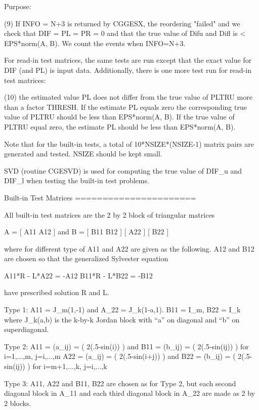 \begin{DoxyParagraph}{Purpose\+: }
\begin{DoxyVerb}
 (9)   If INFO = N+3 is returned by CGGESX, the reordering "failed"
       and we check that DIF = PL = PR = 0 and that the true value of
       Difu and Difl is < EPS*norm(A, B). We count the events when
       INFO=N+3.

 For read-in test matrices, the same tests are run except that the
 exact value for DIF (and PL) is input data.  Additionally, there is
 one more test run for read-in test matrices:

 (10)  the estimated value PL does not differ from the true value of
       PLTRU more than a factor THRESH. If the estimate PL equals
       zero the corresponding true value of PLTRU should be less than
       EPS*norm(A, B). If the true value of PLTRU equal zero, the
       estimate PL should be less than EPS*norm(A, B).

 Note that for the built-in tests, a total of 10*NSIZE*(NSIZE-1)
 matrix pairs are generated and tested. NSIZE should be kept small.

 SVD (routine CGESVD) is used for computing the true value of DIF_u
 and DIF_l when testing the built-in test problems.

 Built-in Test Matrices
 ======================

 All built-in test matrices are the 2 by 2 block of triangular
 matrices

          A = [ A11 A12 ]    and      B = [ B11 B12 ]
              [     A22 ]                 [     B22 ]

 where for different type of A11 and A22 are given as the following.
 A12 and B12 are chosen so that the generalized Sylvester equation

          A11*R - L*A22 = -A12
          B11*R - L*B22 = -B12

 have prescribed solution R and L.

 Type 1:  A11 = J_m(1,-1) and A_22 = J_k(1-a,1).
          B11 = I_m, B22 = I_k
          where J_k(a,b) is the k-by-k Jordan block with ``a'' on
          diagonal and ``b'' on superdiagonal.

 Type 2:  A11 = (a_ij) = ( 2(.5-sin(i)) ) and
          B11 = (b_ij) = ( 2(.5-sin(ij)) ) for i=1,...,m, j=i,...,m
          A22 = (a_ij) = ( 2(.5-sin(i+j)) ) and
          B22 = (b_ij) = ( 2(.5-sin(ij)) ) for i=m+1,...,k, j=i,...,k

 Type 3:  A11, A22 and B11, B22 are chosen as for Type 2, but each
          second diagonal block in A_11 and each third diagonal block
          in A_22 are made as 2 by 2 blocks.


\end{DoxyVerb}
\end{DoxyParagraph}
